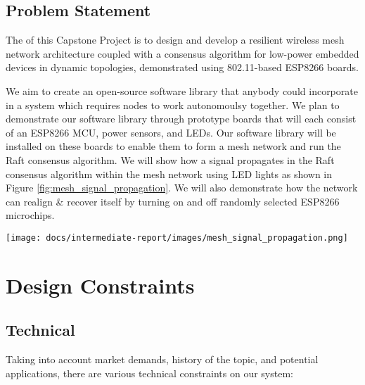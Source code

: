\documentclass[compsoc]{IEEEtran}
\begin{document}
\subsection{Problem Statement}

The of this Capstone Project is to design and develop a resilient wireless mesh network architecture coupled with a consensus algorithm for low-power embedded devices in dynamic topologies, demonstrated using 802.11-based ESP8266 boards.

We aim to create an open-source software library that anybody could incorporate in a system which requires nodes to work autonomoulsy together. We plan to demonstrate our software library through prototype boards that will each consist of an ESP8266 MCU, power sensors, and LEDs. Our software library will be installed on these boards to enable them to form a mesh network and run the Raft consensus algorithm. We will show how a signal propagates in the Raft consensus algorithm within the mesh network using LED lights as shown in Figure \ref{fig:mesh_signal_propagation}. We will also demonstrate how the network can realign \& recover itself by turning on and off randomly selected ESP8266 microchips.

\begingroup
    \centering
    \medskip
    \texttt{[image: docs/intermediate-report/images/mesh\_signal\_propagation.png]}
    \label{fig:mesh_signal_propagation}
\endgroup


\section{Design Constraints}
\subsection{Technical}

Taking into account market demands, history of the topic, and potential applications, there are various technical constraints on our system:
\end{document}
